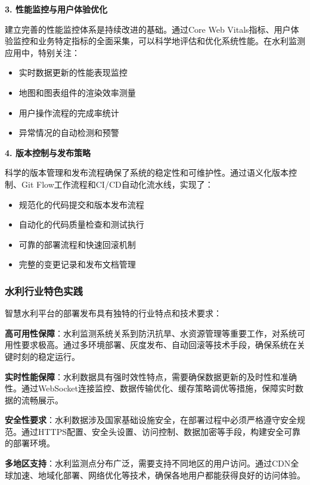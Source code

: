 \textbf{3. 性能监控与用户体验优化}

建立完善的性能监控体系是持续改进的基础。通过Core Web Vitals指标、用户体验监控和业务特定指标的全面采集，可以科学地评估和优化系统性能。在水利监测应用中，特别关注：

\begin{itemize}
\tightlist
\item
  实时数据更新的性能表现监控
\item
  地图和图表组件的渲染效率测量
\item
  用户操作流程的完成率统计
\item
  异常情况的自动检测和预警
\end{itemize}

\textbf{4. 版本控制与发布策略}

科学的版本管理和发布流程确保了系统的稳定性和可维护性。通过语义化版本控制、Git Flow工作流程和CI/CD自动化流水线，实现了：

\begin{itemize}
\tightlist
\item
  规范化的代码提交和版本发布流程
\item
  自动化的代码质量检查和测试执行
\item
  可靠的部署流程和快速回滚机制
\item
  完整的变更记录和发布文档管理
\end{itemize}

\subsubsection{水利行业特色实践}\label{ux6c34ux5229ux884cux4e1aux7279ux8272ux5b9eux8df5}

智慧水利平台的部署发布具有独特的行业特点和技术要求：

\textbf{高可用性保障}：水利监测系统关系到防汛抗旱、水资源管理等重要工作，对系统可用性要求极高。通过多环境部署、灰度发布、自动回滚等技术手段，确保系统在关键时刻的稳定运行。

\textbf{实时性能保障}：水利数据具有强时效性特点，需要确保数据更新的及时性和准确性。通过WebSocket连接监控、数据传输优化、缓存策略调优等措施，保障实时数据的流畅展示。

\textbf{安全性要求}：水利数据涉及国家基础设施安全，在部署过程中必须严格遵守安全规范。通过HTTPS配置、安全头设置、访问控制、数据加密等手段，构建安全可靠的部署环境。

\textbf{多地区支持}：水利监测点分布广泛，需要支持不同地区的用户访问。通过CDN全球加速、地域化部署、网络优化等技术，确保各地用户都能获得良好的访问体验。

